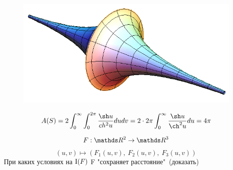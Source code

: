 \documentclass[main]{subfiles}
\begin{document}
\begin{Sol}
      \begin{figure}[H]
          \includegraphics[scale=0.3]{pics/8_1}
          \centering
      \end{figure}

      \[A(S) = 2 \int_0^{\infty} \int_0^{2\pi} \dfrac{\sh u}{ch^2 u} du dv = 2 \cdot 2\pi \int_0^{\infty} \dfrac{\sh u}{\ch^2 u} du = 4\pi\]
    \end{Sol}

    \begin{Example}
      \[F: \R^2 \ra \R^3\]
      \[(u,v) \mapsto (F_1(u,v),\ F_2(u,v),\ F_3 (u,v))\]
      При каких условиях на $\RNumb{1}(F)$ F "сохраняет расстояние"\ (доказать)
    \end{Example}
\end{document}

